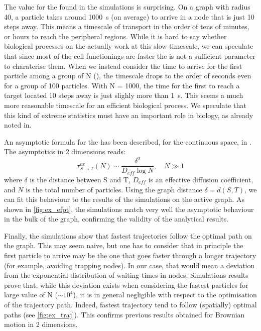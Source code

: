 The value for the  found in the simulations is surprising. On a graph with radius 40, a particle takes around \SI{1000}{\second} (on average) to arrive in a node that is just 10 steps away. This means a timescale of transport in the order of tens of minutes, or hours to reach the peripheral regions. While it is hard to say whether biological processes on the  actually work at this slow timescale, we can speculate that since most of the cell functionings are faster the  is not a sufficient parameter to charaterise them. When we instead consider the time to arrive for the first particle among a group of N (), the timescale drops to the order of seconds even for a group of 100 particles. With N = 1000, the time for the first to reach a target located 10 steps away is just slighly more than \SI{1}{\second}. This seems a much more reasonable timescale for an efficient biological process. We speculate that this kind of extreme statistics must have an important role in biology, as already noted in.

An asymptotic formula for the  has been described, for the continuous space, in . The asymptotics in 2 dimensions reads:
\begin{equation}
  \tau^{ex}_{S \to T}(N) \sim \frac{\delta^2}{D_{eff} \log N},\quad N \gg 1
\end{equation}
where $\delta$ is the distance between S and T, $D_{eff}$ is an effective diffusion coefficient, and $N$ is the total number of particles. Using the graph distance $\delta = d(S, T)$, we can fit this behaviour to the results of the simulations on the active graph. As shown in \cref{fig:ex_efpt}, the simulations match very well the asymptotic behaviour in the bulk of the graph, confirming the validity of the analytical results.

Finally, the simulations show that fastest trajectories follow the optimal path on the graph. This may seem naive, but one has to consider that in principle the first particle to arrive may be the one that goes faster through a longer trajectory (for example, avoiding trapping nodes). In our case, that would mean a deviation from the exponential distribution of waiting times in nodes. Simulations results prove that, while this deviation exists when considering the fastest particles for large value of N ($\sim 10^4$), it is in general negligible with respect to the optimisation of the trajectory path. Indeed, fastest trajectory tend to follow (spatially) optimal paths (see \cref{fig:ex_traj}). This confirms previous results obtained for Brownian motion in 2 dimensions.

